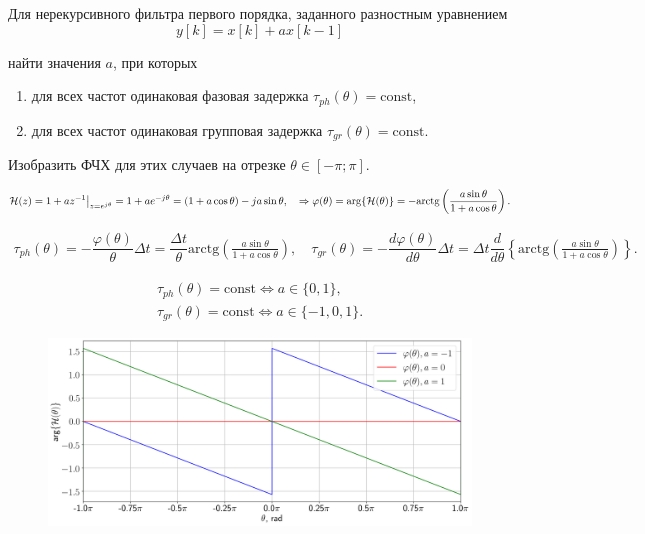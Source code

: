 \protect\thispagestyle{fancy}
\section{}
Для нерекурсивного фильтра первого порядка, заданного разностным уравнением
\begin{equation*}
	y[k] = x[k] + ax[k-1]
\end{equation*}

найти значения $a$, при которых

\begin{enumerate}[label=(\alph*)]
	\item для всех частот одинаковая фазовая задержка $\tau_{ph}(\theta) = \text{const}$,
	\item для всех частот одинаковая групповая задержка $\tau_{gr}(\theta) = \text{const}$.
\end{enumerate}

Изобразить ФЧХ для этих случаев на отрезке $\theta \in [-\pi; \pi]$.

\begin{gather*}
	\mathcal{H}(z) = 1 + az^{-1}\big|_{z = e^{j \theta}} = 1 + ae^{-j \theta} =
	(1 + a\cos\theta) -ja\sin\theta,\quad \Rightarrow
	\varphi(\theta) = \arg\{\mathcal{H}(\theta)\} = -\text{arctg}\left(\frac{a\sin\theta}{1+a\cos\theta}\right).
\end{gather*}

\begin{align*}
	\tau_{ph}(\theta) = -\dfrac{\varphi(\theta)}{\theta}\Delta t = \dfrac{\Delta t}{\theta}\text{arctg}\left(\frac{a\sin\theta}{1+a\cos\theta}\right),\quad
	\tau_{gr}(\theta) = -\dfrac{d\varphi(\theta)}{d\theta}\Delta t = \Delta t \dfrac{d}{d\theta} \left\{ \text{arctg}\left(\frac{a\sin\theta}{1+a\cos\theta}\right) \right\}.
\end{align*}

\begin{gather*}
	\tau_{ph}(\theta) = \text{const} \Leftrightarrow a \in \{0, 1\},\\
	\tau_{gr}(\theta) = \text{const} \Leftrightarrow a \in \{-1, 0, 1\}.
\end{gather*}

\begin{figure}[!h]
	\centering
	\includegraphics[width=0.8\columnwidth]{pics/fall/13/13-1.png}
	\label{fig:13-1}
\end{figure}


